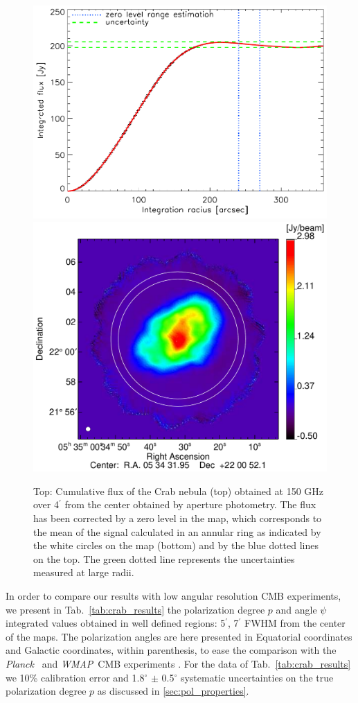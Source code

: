 \documentclass[twocolumn,traditabstract]{aa}
\def\Planck{\textit{Planck}}
\def\WMAP{\textit{WMAP}}
\begin{document}
\begin{figure}[h!]
  \centering
  \includegraphics[width=0.7\linewidth,keepaspectratio]{figures/Crab_integrated_flux_2mm.pdf}
  \includegraphics[width=0.8\linewidth,keepaspectratio]{figures/Crab_I_v3_2mm_ring.pdf}
     \caption{Top:
       Cumulative flux of the Crab nebula (top) obtained at 150 GHz over
       4$^{\prime}$ from the center obtained by aperture photometry. The flux
       has been corrected by a zero level in the map, which corresponds to the
       mean of the signal calculated in an annular ring as indicated by the
       white circles on the map (bottom) and by the blue dotted lines on the
       top. The green dotted line represents the uncertainties measured at large
       radii.}
\label{crab_integrated_flux}
\end{figure}

In order to compare our results with low angular resolution CMB experiments, we present in Tab.~\ref{tab:crab_results} the
polarization degree $p$ and angle $\psi$ integrated values obtained in well
defined regions: 5$^\prime$, 7$^\prime$ FWHM from the center of the maps.
The polarization angles are here presented in Equatorial coordinates and Galactic coordinates, within parenthesis, to ease the comparison with the \Planck\ \citep{2015arXiv150702058P} and \WMAP\ CMB experiments \citep{2011ApJS..192...19W}.
For the data of Tab.~\ref{tab:crab_results} we 10\% calibration error and 1.8$^{\circ}$ $\pm$ 0.5$^{\circ}$ systematic uncertainties on the true polarization degree $p$ as discussed in \ref{sec:pol_properties}.
\end{document}
